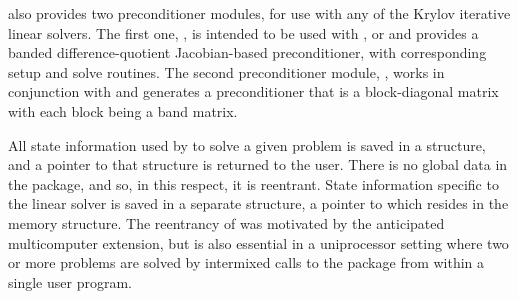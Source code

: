 {\cvode} also provides two preconditioner modules, for use with any of
the Krylov iterative linear solvers. The first one, {\cvbandpre},
is intended to be used with {\nvecs}, {\nvecopenmp} or {\nvecpthreads}
and provides a banded difference-quotient Jacobian-based
preconditioner, with corresponding setup and solve routines.
The second preconditioner module, {\cvbbdpre}, works in conjunction
with {\nvecp} and generates a preconditioner that is a block-diagonal
matrix with each block being a band matrix.

All state information used by {\cvode} to solve a given problem is saved
in a structure, and a pointer to that structure is returned to the
user.  There is no global data in the {\cvode} package, and so, in this
respect, it is reentrant. State information specific to the linear
solver is saved in a separate structure, a pointer to which resides in
the {\cvode} memory structure. The reentrancy of {\cvode} was motivated
by the anticipated multicomputer extension, but is also essential
in a uniprocessor setting where two or more problems are solved by
intermixed calls to the package from within a single user program.

